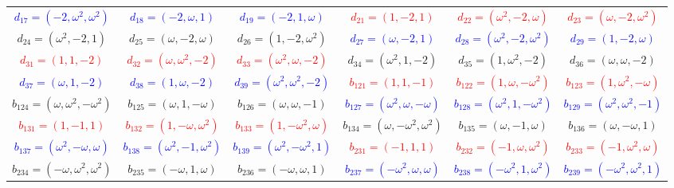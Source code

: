 \documentclass[%
  reprint,
  superscriptaddress,
  showpacs,
  showkeys,
  amsmath,amssymb,
  pra,
  longbibliography,
  floatfix,
  x11names
]{revtex4-2}
\begin{document}
\begin{table}[htbp!]
\begin{ruledtabular}
\begin{tabular}{*{6}{c}}
\textcolor{blue}{$d_{17}=(-2,\omega^2,\omega^2)$} & \textcolor{blue}{$d_{18}=(-2,\omega,1)$} & \textcolor{blue}{$d_{19}=(-2,1,\omega)$} & \textcolor{red}{$d_{21}=(1,-2,1)$} & \textcolor{red}{$d_{22}=(\omega^2,-2,\omega)$} & \textcolor{red}{$d_{23}=(\omega,-2,\omega^2)$} \\
\textcolor{green!40!black}{$d_{24}=(\omega^2,-2,1)$} & \textcolor{green!40!black}{$d_{25}=(\omega,-2,\omega)$} & \textcolor{green!40!black}{$d_{26}=(1,-2,\omega^2)$} & \textcolor{blue}{$d_{27}=(\omega,-2,1)$} & \textcolor{blue}{$d_{28}=(\omega^2,-2,\omega^2)$} & \textcolor{blue}{$d_{29}=(1,-2,\omega)$} \\
\textcolor{red}{$d_{31}=(1,1,-2)$} & \textcolor{red}{$d_{32}=(\omega,\omega^2,-2)$} & \textcolor{red}{$d_{33}=(\omega^2,\omega,-2)$} & \textcolor{green!40!black}{$d_{34}=(\omega^2,1,-2)$} & \textcolor{green!40!black}{$d_{35}=(1,\omega^2,-2)$} & \textcolor{green!40!black}{$d_{36}=(\omega,\omega,-2)$} \\
\textcolor{blue}{$d_{37}=(\omega,1,-2)$} & \textcolor{blue}{$d_{38}=(1,\omega,-2)$} & \textcolor{blue}{$d_{39}=(\omega^2,\omega^2,-2)$} & \textcolor{red}{$b_{121}=(1,1,-1)$} & \textcolor{red}{$b_{122}=(1,\omega,-\omega^2)$} & \textcolor{red}{$b_{123}=(1,\omega^2,-\omega)$} \\
\textcolor{green!40!black}{$b_{124}=(\omega,\omega^2,-\omega^2)$} & \textcolor{green!40!black}{$b_{125}=(\omega,1,-\omega)$} & \textcolor{green!40!black}{$b_{126}=(\omega,\omega,-1)$} & \textcolor{blue}{$b_{127}=(\omega^2,\omega,-\omega)$} & \textcolor{blue}{$b_{128}=(\omega^2,1,-\omega^2)$} & \textcolor{blue}{$b_{129}=(\omega^2,\omega^2,-1)$} \\
\textcolor{red}{$b_{131}=(1,-1,1)$} & \textcolor{red}{$b_{132}=(1,-\omega,\omega^2)$} & \textcolor{red}{$b_{133}=(1,-\omega^2,\omega)$} & \textcolor{green!40!black}{$b_{134}=(\omega,-\omega^2,\omega^2)$} & \textcolor{green!40!black}{$b_{135}=(\omega,-1,\omega)$} & \textcolor{green!40!black}{$b_{136}=(\omega,-\omega,1)$} \\
\textcolor{blue}{$b_{137}=(\omega^2,-\omega,\omega)$} & \textcolor{blue}{$b_{138}=(\omega^2,-1,\omega^2)$} & \textcolor{blue}{$b_{139}=(\omega^2,-\omega^2,1)$} & \textcolor{red}{$b_{231}=(-1,1,1)$} & \textcolor{red}{$b_{232}=(-1,\omega,\omega^2)$} & \textcolor{red}{$b_{233}=(-1,\omega^2,\omega)$} \\
\textcolor{green!40!black}{$b_{234}=(-\omega,\omega^2,\omega^2)$} & \textcolor{green!40!black}{$b_{235}=(-\omega,1,\omega)$} & \textcolor{green!40!black}{$b_{236}=(-\omega,\omega,1)$} & \textcolor{blue}{$b_{237}=(-\omega^2,\omega,\omega)$} & \textcolor{blue}{$b_{238}=(-\omega^2,1,\omega^2)$} & \textcolor{blue}{$b_{239}=(-\omega^2,\omega^2,1)$} \\

\end{tabular}
\end{ruledtabular}
\end{table}
\end{document}
